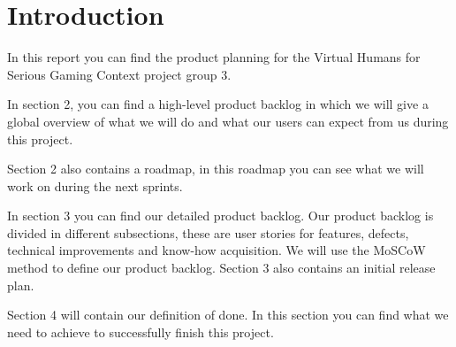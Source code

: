 \section{Introduction}
In this report you can find the product planning for the Virtual Humans for Serious Gaming Context project group 3. \\ \par 
In section 2, you can find a high-level product backlog in which we will give a global overview of what we will do and what our users can expect from us during this project. \par
Section 2 also contains a roadmap, in this roadmap you can see what we will work on during the next sprints. \\ \par
In section 3 you can find our detailed product backlog. Our product backlog is divided in different subsections, these are user stories for features, defects, technical improvements and know-how acquisition. We will use the MoSCoW method to define our product backlog. Section 3 also contains an initial release plan. \\ \par
Section 4 will contain our definition of done. In this section you can find what we need to achieve to successfully finish this project. \\ \par
